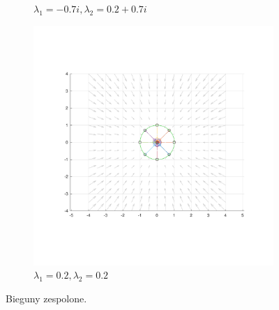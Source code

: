 \documentclass[]{article}
\begin{document}
\begin{figure}[H]
\begin{subfigure}{.5\textwidth}
		\caption{$\lambda_1 = -0.7i, \lambda_2 = 0.2 + 0.7i $}
		\label{fig:imag_1}
	\end{subfigure}%
	\begin{subfigure}{.5\textwidth}
		\centering
		\includegraphics[width=0.99\linewidth]{imag_real}
		\caption{$\lambda_1 = 0.2, \lambda_2 = 0.2 $}
		\label{fig:imag_3}
	\end{subfigure}%
	\caption{Bieguny zespolone.}
	\label{fig3}
\end{figure}
\end{document}
